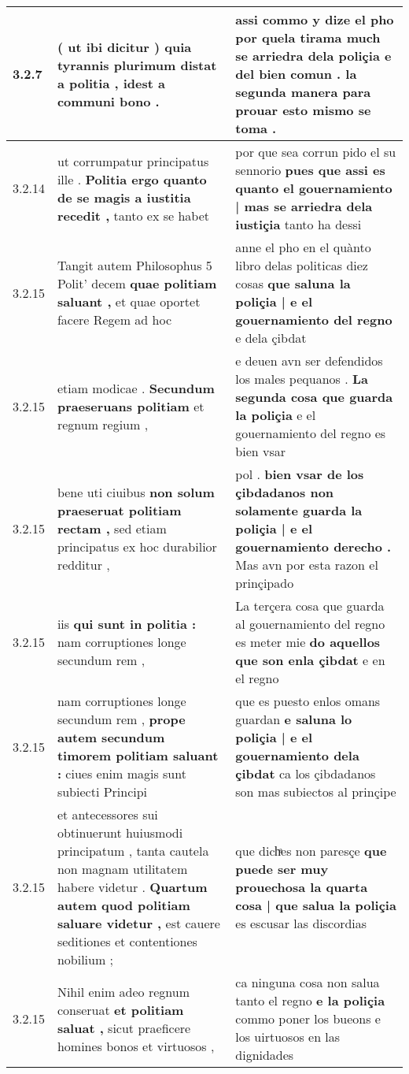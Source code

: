 \begin{tabular}{|p{1cm}|p{6.5cm}|p{6.5cm}|}
3.2.7 & ( ut ibi dicitur ) \textbf{ quia tyrannis plurimum distat a politia , } idest a communi bono . & assi commo y dize el pho \textbf{ por quela tirama much se arriedra dela poliçia e del bien comun . } la segunda manera para prouar esto mismo se toma . \\\hline
3.2.14 & ut corrumpatur principatus ille . \textbf{ Politia ergo quanto de se magis a iustitia recedit , } tanto ex se habet & por que sea corrun pido el su sennorio \textbf{ pues que assi es quanto el gouernamiento | mas se arriedra dela iustiçia } tanto ha dessi \\\hline
3.2.15 & Tangit autem Philosophus 5 Polit’ decem \textbf{ quae politiam saluant , } et quae oportet facere Regem ad hoc & anne el pho en el quànto libro delas politicas diez cosas \textbf{ que saluna la poliçia | e el gouernamiento del regno } e dela çibdat \\\hline
3.2.15 & etiam modicae . \textbf{ Secundum praeseruans politiam } et regnum regium , & e deuen avn ser defendidos los males pequanos . \textbf{ La segunda cosa que guarda la poliçia } e el gouernamiento del regno es bien vsar \\\hline
3.2.15 & bene uti ciuibus \textbf{ non solum praeseruat politiam rectam , } sed etiam principatus ex hoc durabilior redditur , & pol . \textbf{ bien vsar de los çibdadanos non solamente guarda la poliçia | e el gouernamiento derecho . } Mas avn por esta razon el prinçipado \\\hline
3.2.15 & iis \textbf{ qui sunt in politia : } nam corruptiones longe secundum rem , & La terçera cosa que guarda al gouernamiento del regno es meter mie \textbf{ do aquellos que son enla çibdat } e en el regno \\\hline
3.2.15 & nam corruptiones longe secundum rem , \textbf{ prope autem secundum timorem politiam saluant : } ciues enim magis sunt subiecti Principi & que es puesto enlos omans guardan \textbf{ e saluna lo poliçia | e el gouernamiento dela çibdat } ca los çibdadanos son mas subiectos al prinçipe \\\hline
3.2.15 & et antecessores sui obtinuerunt huiusmodi principatum , tanta cautela non magnam utilitatem habere videtur . \textbf{ Quartum autem quod politiam saluare videtur , } est cauere seditiones et contentiones nobilium ; & que dichͣes non paresçe \textbf{ que puede ser muy prouechosa la quarta cosa | que salua la poliçia } es escusar las discordias \\\hline
3.2.15 & Nihil enim adeo regnum conseruat \textbf{ et politiam saluat , } sicut praeficere homines bonos et virtuosos , & ca ninguna cosa non salua tanto el regno \textbf{ e la poliçia } commo poner los bueons e los uirtuosos en las dignidades \\\hline

\end{tabular}
